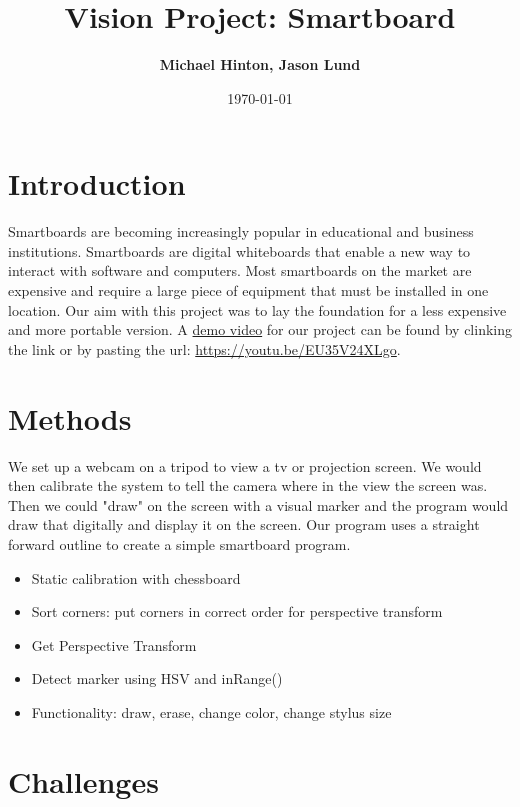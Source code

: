 \documentclass[letterpaper,10pt,oneside,onecolumn, titlepage]{article}
\title{Vision Project: Smartboard}
\author{\Large\textbf{Michael Hinton, Jason Lund}}
\date{\Large{\today}}
\begin{document}
\maketitle


\section{Introduction}
Smartboards are becoming increasingly popular in educational and business institutions.  Smartboards are digital whiteboards that enable a new way to interact with software and computers.  Most smartboards on the market are expensive and require a large piece of equipment that must be installed in one location.  Our aim with this project was to lay the foundation for a less expensive and more portable version.  A \href{https://youtu.be/EU35V24XLgo}{demo video} for our project can be found by clinking the link or by pasting the url: \url{https://youtu.be/EU35V24XLgo}.

\section{Methods}
We set up a webcam on a tripod to view a tv or projection screen.  We would then calibrate the system to tell the camera where in the view the screen was.  Then we could "draw" on the screen with a visual marker and the program would draw that digitally and display it on the screen.  Our program uses a straight forward outline to create a simple smartboard program.
\begin{itemize}
    \item Static calibration with chessboard
    \item Sort corners: put corners in correct order for perspective transform
    \item Get Perspective Transform
    \item Detect marker using HSV and inRange()
    \item Functionality: draw, erase, change color, change stylus size
\end{itemize}

\section{Challenges}
\end{document}
